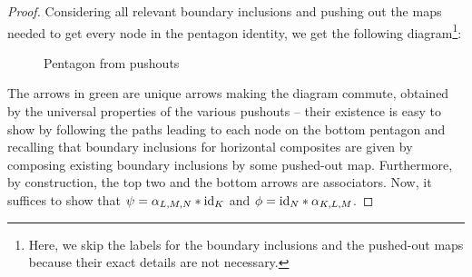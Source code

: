 \documentclass[./Thick_TQFTs_and_Quantum_Information.tex]{subfiles}
\begin{document}
\begin{proof}
Considering all relevant boundary inclusions and pushing out the maps needed to
get every node in the pentagon identity, we get the following
diagram\footnote{Here, we skip the labels for the boundary inclusions and the
pushed-out maps because their exact details are not necessary.}:
\begin{figure}[H]\label{fig:pushoutpentagon}
  \begin{center}
  \end{center}
  \caption{Pentagon from pushouts}
\end{figure}
The arrows in green are unique arrows making the diagram commute, obtained by
the universal properties of the various pushouts -- their existence is easy to
show by following the paths leading to each node on the bottom pentagon and
recalling that boundary inclusions for horizontal composites are given by
composing existing boundary inclusions by some pushed-out map.
Furthermore, by construction, the top two and the bottom arrows are
associators. Now, it suffices to show that $\psi = \alpha_{L, M, N} * \text{id}_K$
and $\phi = \text{id}_N * \alpha_{K, L, M}$.


\end{proof}
\end{document}
